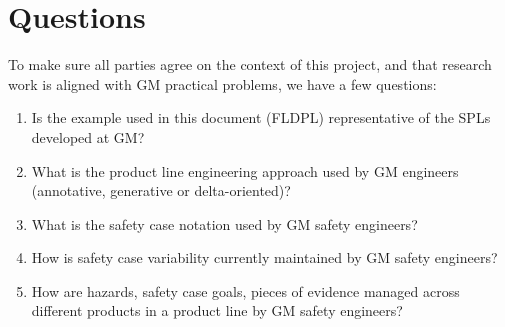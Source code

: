 \documentclass[11pt]{article}
\begin{document}
\section{Questions}

To make sure all parties agree on the context of this project, and that research work is aligned with GM practical problems, we have a few questions:

\begin{enumerate}

\item Is the example used in this document (FLDPL) representative of the SPLs developed at GM?

\item What is the product line engineering approach used by GM engineers (annotative, generative or delta-oriented)?

\item What is the safety case notation used by GM safety engineers?

\item How is safety case variability currently maintained by GM safety engineers?

\item How are hazards, safety case goals, pieces of evidence managed across different products in a product line by GM safety engineers?

\end{enumerate}
 
\end{document}
